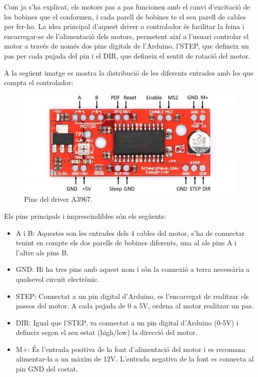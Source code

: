Com ja s'ha explicat, els motors pas a pas funcionen amb el canvi d'excitació de les bobines que el conformen, i cada parell de bobines te el seu parell de cables per fer-ho. La idea principal d'aquest driver o controlador és facilitar la feina i encarregar-se de l'alimentació dels motors, permetent així a l'usuari controlar el motor a través de només dos pins digitals de l'Arduino, l'STEP, que defineix un pas per cada pujada del pin i el DIR, que defineix el sentit de rotació del motor. 


A la següent imatge es mostra la distribució de les diferents entrades amb les que compta el controlador:

\begin{figure}[H]
	\centering
	\includegraphics[width=1.00\textwidth]{PinsA3967.eps}
	\caption{Pins del driver A3967.}
	\label{fig:PinsA3967}
\end{figure}


Els pins principals i imprescindibles són els següents:


\begin{itemize}
	
	\item	A i B: Aquestes son les entrades dels 4 cables del motor, s'ha de connectar tenint en compte els dos parells de bobines diferents, una al als pins A i l'altre als pins B. 
	
	\item GND: Hi ha tres pins amb aquest nom i són la connexió a terra necessària a qualsevol circuit electrònic.
	
	\item STEP: Connectat a un pin digital d'Arduino, es l'encarregat de realitzar els passos del motor. A cada pujada de 0 a 5V, ordena al motor realitzar un pas. 
	
	\item DIR: Igual que l'STEP, va connectat a un pin digital d'Arduino (0-5V) i defineix segon el seu estat (high/low) la direcció del motor.
	
	\item M+: És l'entrada positiva de la font d'alimentació del motor i es recomana alimentar-la a un màxim de 12V. L'entrada negativa de la font es connecta al pin GND del costat.
	
\end{itemize}

